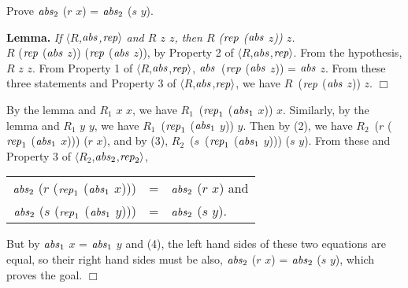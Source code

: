 \documentclass[envcountsame,runningheads]{llncs}
\begin{document}
 Prove ${\it abs}_2$ ($r$ $x$) = ${\it abs}_2$ ($s$ $y$).
\begin{center}
\begin{minipage}{3.8in}
{\bf Lemma.} {\it
If 
$\langle R$,${\it abs}$,${\it rep} \rangle$
and
$R$ $z$ $z$, then {\rm $R$ (${\it rep}$ (${\it abs}$ $z$)) $z$}.
} \\
$R$ (${\it rep}$ (${\it abs}$ $z$)) (${\it rep}$ (${\it abs}$ $z$)),
by Property 2 of 
$\langle R$,${\it abs}$,${\it rep} \rangle$.
From the hypothesis,
$R$ $z$ $z$.
From Property 1 of
$\langle R$,${\it abs}$,${\it rep} \rangle$,
\linebreak[3]
${\it abs}$~(${\it rep}$ (${\it abs}$ $z$)) = ${\it abs}$ $z$.
From these three statements and Property 3 of
$\langle R$,${\it abs}$,${\it rep} \rangle$,
we have
$R$~(${\it rep}$ (${\it abs}$ $z$)) $z$.
%
$\Box$
\end{minipage}
\end{center}

By the lemma and $R_1$ $x$ $x$, we have 
$R_1$~(${\it rep}_1$ (${\it abs}_1$ $x$)) $x$.
Similarly, 
by the lemma and $R_1$ $y$ $y$, we have 
$R_1$~(${\it rep}_1$ (${\it abs}_1$ $y$)) $y$.
Then by (2), we have
\linebreak[3]
$R_2$~($r$ (${\it rep}_1$ (${\it abs}_1$ $x$))) ($r$ $x$), and
by (3),
$R_2$~($s$~(${\it rep}_1$ (${\it abs}_1$ $y$))) ($s$ $y$).
From these and Property 3 of
$\langle R_2$,${\it abs}_2$,${\it rep}_2 \rangle$,
\begin{center}
\begin{tabular}{rcl}
${\it abs}_2$ ($r$ (${\it rep}_1$ (${\it abs}_1$ $x$)))
& = & ${\it abs}_2$ ($r$ $x$)
and \\
${\it abs}_2$ ($s$ (${\it rep}_1$ (${\it abs}_1$ $y$)))
& = & ${\it abs}_2$ ($s$ $y$).
\end{tabular}
\end{center}
But by ${\it abs}_1$ $x$ = ${\it abs}_1$ $y$ and (4),
the left hand sides of these two equations are equal, so
their right hand sides must be also,
${\it abs}_2$ ($r$ $x$) = ${\it abs}_2$ ($s$ $y$), which proves the goal.
$\Box$
\end{document}
